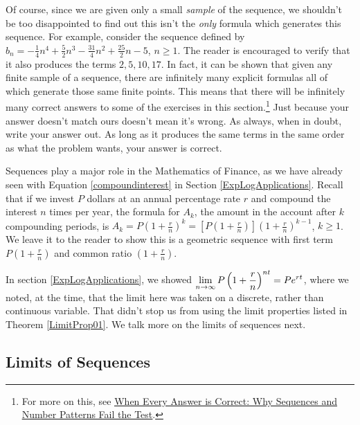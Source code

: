 Of course, since we are given only a small \textit{sample} of the sequence, we shouldn't be too disappointed to find out this isn't the \textit{only} formula which generates this sequence.  For example, consider the sequence defined by $b_{n} = -\frac{1}{4} n^4 + \frac{5}{2} n^3 - \frac{31}{4} n^2 + \frac{25}{2} n - 5$, $n \geq 1$.  The reader is encouraged to verify that it also produces the  terms  $2, 5, 10, 17$.  In fact, it can be shown that given any finite sample of a sequence, there are infinitely many explicit formulas all of which generate those same finite points.  This means that there will be infinitely many correct answers to some of the exercises in this section.\footnote{For more on this, see \href{http://www.math.kent.edu/~white/papers/pattern.pdf}{\underline{When Every Answer is Correct: Why
Sequences and Number Patterns Fail the Test}}.}  Just because your answer doesn't match ours doesn't mean it's wrong.  As always, when in doubt, write your answer out.  As long as it produces the same terms in the same order as what the problem wants, your answer is correct.  

\smallskip

Sequences play a major role in the Mathematics of Finance, as we have already seen with Equation \ref{compoundinterest} in Section \ref{ExpLogApplications}.  Recall that if we invest $P$ dollars at an annual percentage rate $r$ and compound the interest $n$ times per year,  the formula for $A_{k}$, the amount in the account after $k$ compounding periods, is $A_{k} = P\left(1 + \frac{r}{n}\right)^{k} = \left[P\left(1 + \frac{r}{n}\right)\right]\left(1 + \frac{r}{n}\right)^{k-1}$, $ k \geq 1$.  We leave it to the reader to show this is a geometric sequence with first term $P\left(1 + \frac{r}{n}\right)$ and common ratio $\left(1 + \frac{r}{n}\right)$. 

\medskip

 In section \ref{ExpLogApplications}, we showed $\displaystyle{\lim_{n \rightarrow \infty} P\left(1 + \frac{r}{n}\right)^{nt} = Pe^{rt}}$, where we noted, at the time, that the limit here was taken on a discrete, rather than continuous variable.  That didn't stop us from using the limit properties listed in Theorem \ref{LimitProp01}.  We talk more on the limits of sequences next.


\subsection{Limits of Sequences}
\label{sequencelimits}



